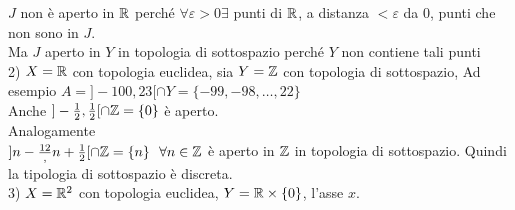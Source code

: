 \documentclass[12px]{article}
\begin{document}
	   $J$ non è aperto in $\mathbb{R}$ perché  $\forall\varepsilon > 0 \exists$ punti di $\mathbb{R}$, a distanza $< \varepsilon$ da $0$, punti che non sono in $J$.\\
	   Ma  $J$ aperto in $Y$ in topologia di sottospazio perché $Y$ non contiene tali punti\\
	   2) $X = \mathbb{R}$ con topologia euclidea, sia $Y = \mathbb{Z}$ con topologia di sottospazio, Ad esempio  $A = ]-100, 23[\cap Y = \{-99,-98,\ldots,22\}$\\
	   Anche $]-\frac 12, \frac 12[\cap \mathbb{Z} = \{0\}$ è aperto.\\
	   Analogamente\\
	   $]n - \frac {12}, n + \frac 12[\cap \mathbb{Z} = \{n\} \ \ \forall n\in \mathbb{Z}$ è aperto in  $\mathbb{Z}$ in topologia di sottospazio. Quindi la tipologia di sottospazio è discreta.\\
	   3) $X = \mathbb{R}^2$ con topologia euclidea, $Y = \mathbb{R} \times \{0\}$, l'asse  $x.$\\
\end{document}
